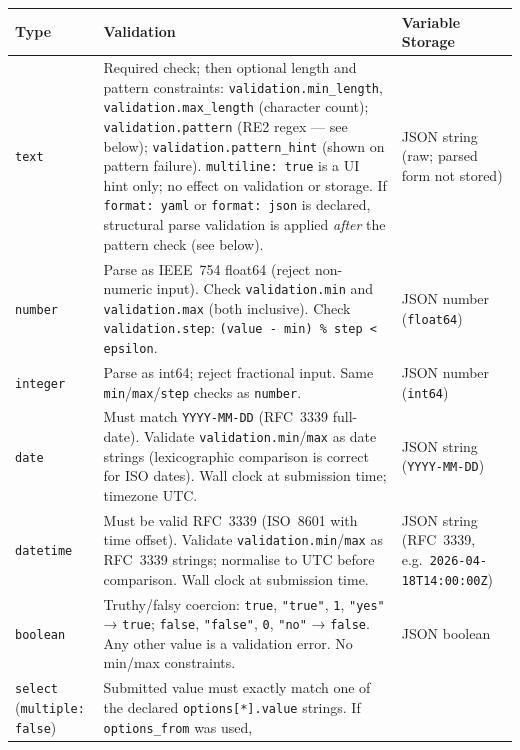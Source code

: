 \begin{center}
\small
\begin{tabular}{|l|p{5.0cm}|p{3.6cm}|}
\hline
\textbf{Type} & \textbf{Validation} & \textbf{Variable Storage} \\
\hline
\texttt{text}
  & Required check; then optional length and pattern constraints:
    \texttt{validation.min\_length}, \texttt{validation.max\_length} (character
    count); \texttt{validation.pattern} (RE2 regex — see below);
    \texttt{validation.pattern\_hint} (shown on pattern failure).
    \texttt{multiline: true} is a UI hint only; no effect on validation or storage.
    If \texttt{format: yaml} or \texttt{format: json} is declared, structural
    parse validation is applied \emph{after} the pattern check (see below).
  & JSON string (raw; parsed form not stored) \\
\hline
\texttt{number}
  & Parse as IEEE~754 float64 (reject non-numeric input).
    Check \texttt{validation.min} and \texttt{validation.max} (both inclusive).
    Check \texttt{validation.step}: \texttt{(value - min) \% step < epsilon}.
  & JSON number (\texttt{float64}) \\
\hline
\texttt{integer}
  & Parse as int64; reject fractional input.
    Same \texttt{min}/\texttt{max}/\texttt{step} checks as \texttt{number}.
  & JSON number (\texttt{int64}) \\
\hline
\texttt{date}
  & Must match \texttt{YYYY-MM-DD} (RFC~3339 full-date).
    Validate \texttt{validation.min}/\texttt{max} as date strings (lexicographic
    comparison is correct for ISO dates).
    Wall clock at submission time; timezone UTC.
  & JSON string (\texttt{YYYY-MM-DD}) \\
\hline
\texttt{datetime}
  & Must be valid RFC~3339 (ISO~8601 with time offset).
    Validate \texttt{validation.min}/\texttt{max} as RFC~3339 strings; normalise to
    UTC before comparison.
    Wall clock at submission time.
  & JSON string (RFC~3339, e.g.\ \texttt{2026-04-18T14:00:00Z}) \\
\hline
\texttt{boolean}
  & Truthy/falsy coercion:
    \texttt{true}, \texttt{"true"}, \texttt{1}, \texttt{"yes"} → \texttt{true};
    \texttt{false}, \texttt{"false"}, \texttt{0}, \texttt{"no"} → \texttt{false}.
    Any other value is a validation error.  No min/max constraints.
  & JSON boolean \\
\hline
\texttt{select}
(\texttt{multiple: false})
  & Submitted value must exactly match one of the declared
    \texttt{options[*].value} strings.  If \texttt{options\_from} was used,

\end{tabular}
\end{center}
